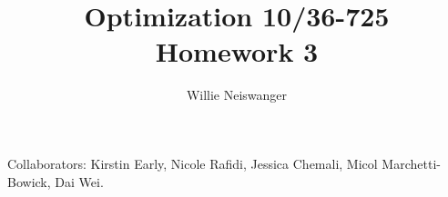 \documentclass{article}
\title{Optimization 10/36-725\\
        Homework 3}
\author{Willie Neiswanger}
\date{}
\begin{document}
\maketitle

Collaborators: Kirstin Early, Nicole Rafidi, Jessica Chemali, Micol Marchetti-Bowick, Dai Wei.
\end{document}
